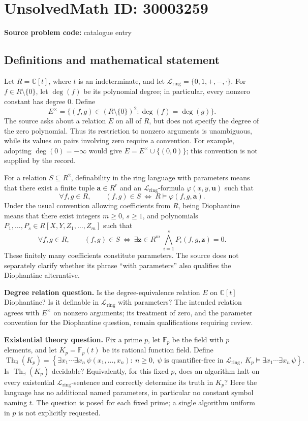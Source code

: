 \documentclass[11pt]{article}
\newcommand{\C}{\mathbb{C}}
\newcommand{\F}{\mathbb{F}}
\begin{document}
\section*{UnsolvedMath ID: 30003259}
\textbf{Source problem code:} catalogue entry
\subsection{Definitions and mathematical statement}
Let \(R=\C[t]\), where \(t\) is an indeterminate, and let \(\mathcal L_{\mathrm{ring}}=\{0,1,+,-,\cdot\}\). For \(f\in R\setminus\{0\}\), let \(\deg(f)\) be its polynomial degree; in particular, every nonzero constant has degree \(0\). Define
\[
E^{\times}=\{(f,g)\in(R\setminus\{0\})^2:\deg(f)=\deg(g)\}.
\]
The source asks about a relation \(E\) on all of \(R\), but does not specify the degree of the zero polynomial. Thus its restriction to nonzero arguments is unambiguous, while its values on pairs involving zero require a convention. For example, adopting \(\deg(0)=-\infty\) would give \(E=E^{\times}\cup\{(0,0)\}\); this convention is not supplied by the record.

For a relation \(S\subseteq R^2\), definability in the ring language with parameters means that there exist a finite tuple \(\mathbf a\in R^r\) and an \(\mathcal L_{\mathrm{ring}}\)-formula \(\varphi(x,y,\mathbf u)\) such that
\[
\forall f,g\in R,\qquad (f,g)\in S\ \Longleftrightarrow\ R\models\varphi(f,g,\mathbf a).
\]
Under the usual convention allowing coefficients from \(R\), being Diophantine means that there exist integers \(m\geq0\), \(s\geq1\), and polynomials \(P_1,\ldots,P_s\in R[X,Y,Z_1,\ldots,Z_m]\) such that
\[
\forall f,g\in R,\qquad (f,g)\in S\ \Longleftrightarrow\ \exists\mathbf z\in R^m\ \bigwedge_{i=1}^{s}P_i(f,g,\mathbf z)=0.
\]
These finitely many coefficients constitute parameters. The source does not separately clarify whether its phrase ``with parameters'' also qualifies the Diophantine alternative.

\textbf{Degree relation question.} Is the degree-equivalence relation \(E\) on \(\C[t]\) Diophantine? Is it definable in \(\mathcal L_{\mathrm{ring}}\) with parameters? The intended relation agrees with \(E^{\times}\) on nonzero arguments; its treatment of zero, and the parameter convention for the Diophantine question, remain qualifications requiring review.

\textbf{Existential theory question.} Fix a prime \(p\), let \(\F_p\) be the field with \(p\) elements, and let \(K_p=\F_p(t)\) be its rational function field. Define
\[
\operatorname{Th}_{\exists}(K_p)=\left\{\exists x_1\cdots\exists x_n\,\psi(x_1,\ldots,x_n):\ n\geq0,\ \psi\text{ is quantifier-free in }\mathcal L_{\mathrm{ring}},\ K_p\models\exists x_1\cdots\exists x_n\,\psi\right\}.
\]
Is \(\operatorname{Th}_{\exists}(K_p)\) decidable? Equivalently, for this fixed \(p\), does an algorithm halt on every existential \(\mathcal L_{\mathrm{ring}}\)-sentence and correctly determine its truth in \(K_p\)? Here the language has no additional named parameters, in particular no constant symbol naming \(t\). The question is posed for each fixed prime; a single algorithm uniform in \(p\) is not explicitly requested.
\end{document}
